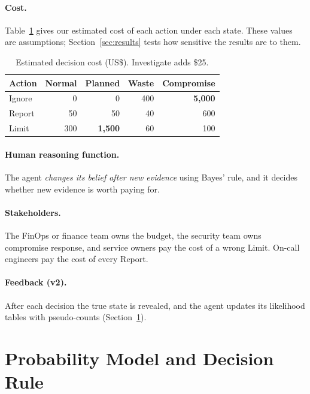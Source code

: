 \documentclass{article}
\begin{document}
\paragraph{Cost.} Table~\ref{tab:cost} gives our estimated cost of each action under each state. These values are assumptions; Section~\ref{sec:results} tests how sensitive the results are to them.

\begin{table}[t]
\centering
\small
\begin{tabular}{lrrrr}
\toprule
Action & Normal & Planned & Waste & Compromise \\
\midrule
Ignore & 0 & 0 & 400 & \textbf{5{,}000} \\
Report & 50 & 50 & 40 & 600 \\
Limit & 300 & \textbf{1{,}500} & 60 & 100 \\
\bottomrule
\end{tabular}
\caption{Estimated decision cost (US\$). Investigate adds \$25.}
\label{tab:cost}
\end{table}

\paragraph{Human reasoning function.} The agent \emph{changes its belief after new evidence} using Bayes' rule, and it decides whether new evidence is worth paying for.

\paragraph{Stakeholders.} The FinOps or finance team owns the budget, the security team owns compromise response, and service owners pay the cost of a wrong Limit. On-call engineers pay the cost of every Report.

\paragraph{Feedback (v2).} After each decision the true state is revealed, and the agent updates its likelihood tables with pseudo-counts (Section~\ref{sec:prob}).

\section{Probability Model and Decision Rule}
\label{sec:prob}
\end{document}
